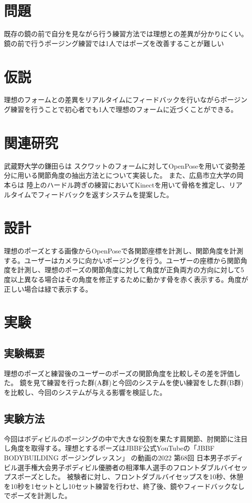 \documentclass[a4j,10pt]{jsarticle}
\begin{document}

\section{問題}
既存の鏡の前で自分を見ながら行う練習方法では理想との差異が分かりにくい。鏡の前で行うポージング練習では1人ではポーズを改善することが難しい

\section{仮説}
理想のフォームとの差異をリアルタイムにフィードバックを行いながらポージング練習を行うことで初心者でも1人で理想のフォームに近づくことができる。

\section{関連研究}
武蔵野大学の鎌田らは \cite{Relatedresearch1}スクワットのフォームに対してOpenPoseを用いて姿勢差分に用いる関節角度の抽出方法とについて実装した。
また、広島市立大学の岡本らは \cite{Relatedresearch2}陸上のハードル跨ぎの練習においてKinectを用いて骨格を推定し、リアルタイムでフィードバックを返すシステムを提案した。
\section{設計}
理想のポーズとする画像からOpenPoseで各関節座標を計測し、関節角度を計測する。ユーザーはカメラに向かいポージングを行う。ユーザーの座標から関節角度を計測し、理想のポーズの関節角度に対して角度が正負両方の方向に対して5度以上異なる場合はその角度を修正するために動かす骨を赤く表示する。角度が正しい場合は緑で表示する。
\section{実験}
\subsection{実験概要}
理想のポーズと練習後のユーザーのポーズの関節角度を比較しその差を評価した。
鏡を見て練習を行った群(A群)と今回のシステムを使い練習をした群(B群)を比較し、今回のシステムが与える影響を検証した。
\subsection{実験方法}
今回はボディビルのポージングの中で大きな役割を果たす肩関節、肘関節に注目し角度を取得する。理想とするポーズはJBBF公式YouTubeの「JBBF　BODYBUILDING ポージングレッスン」\cite{aizawa}
の動画の2022 第68回 日本男子ボディビル選手権大会男子ボディビル優勝者の相澤隼人選手のフロントダブルバイセップスポーズとした。
被験者に対し、フロントダブルバイセップスを10秒、休憩を10秒を1セットとし10セット練習を行わせ、終了後、鏡やフィードバックなしでポーズを計測した。
\end{document}
